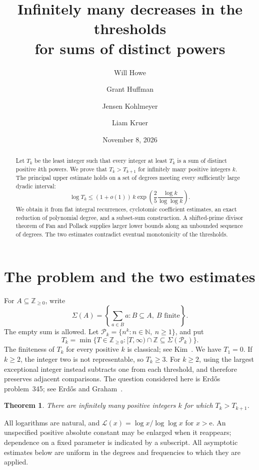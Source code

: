 \documentclass[11pt]{amsart}
\title[Distinct-power thresholds]{Infinitely many decreases in the thresholds\\
for sums of distinct powers}
\author[W. Howe]{Will Howe}
\author[G. Huffman]{Grant Huffman}
\author[J. Kohlmeyer]{Jensen Kohlmeyer}
\author[L. Kruer]{Liam Kruer}
\date{November 8, 2026}
\numberwithin{equation}{section}
\newtheorem{theorem}{Theorem}[section]
\theoremstyle{remark}
\newcommand{\N}{\mathbb N}
\newcommand{\Z}{\mathbb Z}
\newcommand{\e}{\mathrm e}
\begin{document}
\begin{abstract}
Let \(T_k\) be the least integer such that every integer at least \(T_k\)
is a sum of distinct positive \(k\)th powers. We prove that
\(T_k>T_{k+1}\) for infinitely many positive integers \(k\).
The principal upper estimate holds on a set of degrees meeting every
sufficiently large dyadic interval:
\[
 \log T_k\le(1+o(1))\,k
 \exp\!\left(\frac25\frac{\log k}{\log\log k}\right).
\]
We obtain it from flat integral recurrences, cyclotomic coefficient
estimates, an exact reduction of polynomial degree, and a subset-sum
construction. A shifted-prime divisor theorem of Fan and Pollack supplies
larger lower bounds along an unbounded sequence of degrees. The two
estimates contradict eventual monotonicity of the thresholds.
\end{abstract}
\maketitle

\section{The problem and the two estimates}
For \(A\subseteq\Z_{\ge0}\), write
\[
 \Sigma(A)=\left\{\sum_{a\in B}a:B\subseteq A,\ B\text{ finite}\right\}.
\]
The empty sum is allowed. Let \(\mathcal P_k=\{n^k:n\in\N,\ n\ge1\}\), and put
\[
 T_k=\min\{T\in\Z_{\ge0}:[T,\infty)\cap\Z\subseteq\Sigma(\mathcal P_k)\}.
\]
The finiteness of \(T_k\) for every positive \(k\) is classical; see
Kim~\cite{Kim}. We have \(T_1=0\). If \(k\ge2\), the integer two is
not representable, so \(T_k\ge3\). For \(k\ge2\), using the largest
exceptional integer instead subtracts one from each threshold, and
therefore preserves adjacent comparisons. The question considered here
is Erd\H{o}s problem~345; see Erd\H{o}s and Graham~\cite[p.~55]{EG}.

\begin{theorem}\label{thm:main}
There are infinitely many positive integers \(k\) for which
\(T_k>T_{k+1}\).
\end{theorem}

All logarithms are natural, and
\(\mathcal L(x)=\log x/\log\log x\) for \(x>\e\).
An unspecified positive absolute constant may be enlarged when it
reappears; dependence on a fixed parameter is indicated by a subscript.
All asymptotic estimates below are uniform in the degrees and
frequencies to which they are applied.
\end{document}
